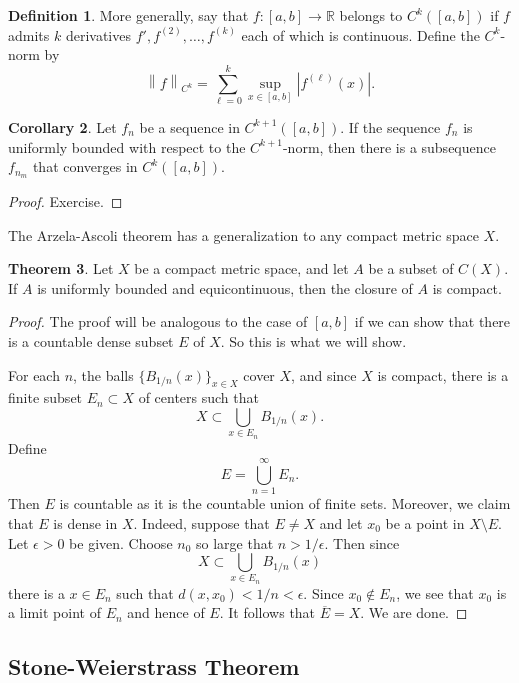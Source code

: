 \documentclass[12pt]{article}
\newcommand{\norm}[1]{\left\lVert#1\right\rVert}
\theoremstyle{definition}
\newtheorem{definition}{Definition}
\theoremstyle{theorem}
\newtheorem{theorem}[definition]{Theorem}
\newtheorem{corollary}[definition]{Corollary}
\begin{document}
\begin{definition}
More generally, say that $f : [a,b] \to \mathbb{R}$ belongs to $C^k([a,b])$ if $f$ admits $k$ derivatives $f', f^{(2)}, \ldots, f^{(k)}$ each of which is continuous. Define the $C^k$-norm by 
\[
\norm{f}_{C^k} = \sum_{\ell = 0}^k \sup_{x \in [a,b]}|f^{(\ell)}(x)|.
\]
\end{definition}

\begin{corollary}
Let $f_n$ be a sequence in $C^{k+1}([a,b])$. If the sequence $f_n$ is uniformly bounded with respect to the $C^{k+1}$-norm, then there is a subsequence $f_{n_m}$ that converges in $C^{k}([a,b])$. 
\end{corollary}

\begin{proof}
Exercise. 
\end{proof}

The Arzela-Ascoli theorem has a generalization to any compact metric space $X$. 

\begin{theorem}
Let $X$ be a compact metric space, and let $A$ be a subset of $C(X)$. If $A$ is uniformly bounded and equicontinuous, then the closure of $A$ is compact. 
\end{theorem}

\begin{proof}
The proof will be analogous to the case of $[a,b]$ if we can show that there is a countable dense subset $E$ of $X$. So this is what we will show. 

For each $n$, the balls $\{B_{1/n}(x)\}_{x \in X}$ cover $X$, and since $X$ is compact, there is a finite subset $E_n \subset X$ of centers such that 
\[
X \subset \bigcup_{x \in E_n} B_{1/n}(x).
\]
Define 
\[
E = \bigcup_{n = 1}^{\infty}E_n.
\]
Then $E$ is countable as it is the countable union of finite sets. Moreover, we claim that $E$ is dense in $X$. Indeed, suppose that $E \ne X$ and let $x_0$ be a point in $X \setminus E$. Let $\epsilon > 0$ be given. Choose $n_0$ so large that $n > 1/\epsilon$. Then since 
\[
X \subset \bigcup_{x \in E_{n}}B_{1/n}(x)
\]
there is a $x \in E_{n}$ such that $d(x,x_0) < 1/n < \epsilon$. Since $x_0 \notin E_n$, we see that $x_0$ is a limit point of $E_n$ and hence of $E$. It follows that $\overline{E} = X$. We are done. 
\end{proof}


\subsection{Stone-Weierstrass Theorem}
\end{document}

